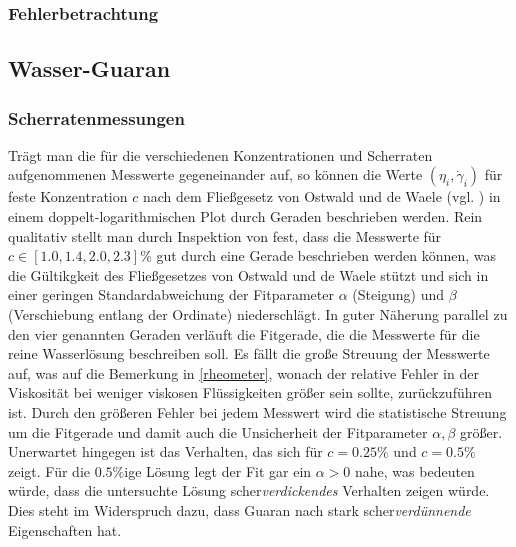 \documentclass[11pt,a4paper,oneside]{scrartcl}
\begin{document}
\subsubsection{Fehlerbetrachtung}\label{Suc_Fehler}


\subsection{Wasser-Guaran}

\subsubsection{Scherratenmessungen}\label{guar_mess}
Trägt man die für die verschiedenen Konzentrationen und Scherraten aufgenommenen Messwerte gegeneinander auf, so können die Werte $(\eta_i,\dot\gamma_i)$ für feste Konzentration $c$ nach dem Fließgesetz von Ostwald und de Waele (vgl. \cite{dewiki:192899581}) in einem doppelt-logarithmischen Plot durch Geraden beschrieben werden. 
Rein qualitativ stellt man durch Inspektion von  fest, dass die Messwerte für $c\in[1.0,1.4,2.0,2.3]\%$ gut durch eine Gerade beschrieben werden können, was die Gültikgkeit des Fließgesetzes von Ostwald und de Waele stützt und sich in einer geringen Standardabweichung der Fitparameter $\alpha$ (\glqq Steigung\grqq) und $\beta$ (\glqq Verschiebung entlang der Ordinate\grqq) niederschlägt. In guter Näherung parallel zu den vier genannten Geraden verläuft die Fitgerade, die die Messwerte für die reine Wasserlösung beschreiben soll. Es fällt die große Streuung der Messwerte auf, was auf die Bemerkung in \ref{rheometer}, wonach der relative Fehler in der Viskosität bei weniger viskosen Flüssigkeiten größer sein sollte, zurückzuführen ist. Durch den größeren Fehler bei jedem Messwert wird die statistische Streuung um die Fitgerade und damit auch die Unsicherheit der Fitparameter $\alpha,\beta$ größer. \\
Unerwartet hingegen ist das Verhalten, das sich für $c=0.25\%$ und $c=0.5\%$ zeigt. Für die $0.5\%$ige Lösung legt der Fit gar ein $\alpha>0$ nahe, was bedeuten würde, dass die untersuchte Lösung scher\emph{verdickendes} Verhalten zeigen würde.  Dies steht im Widerspruch dazu, dass Guaran nach \cite{enwiki:1124053245} stark scher\emph{verdünnende} Eigenschaften hat. 
\end{document}

